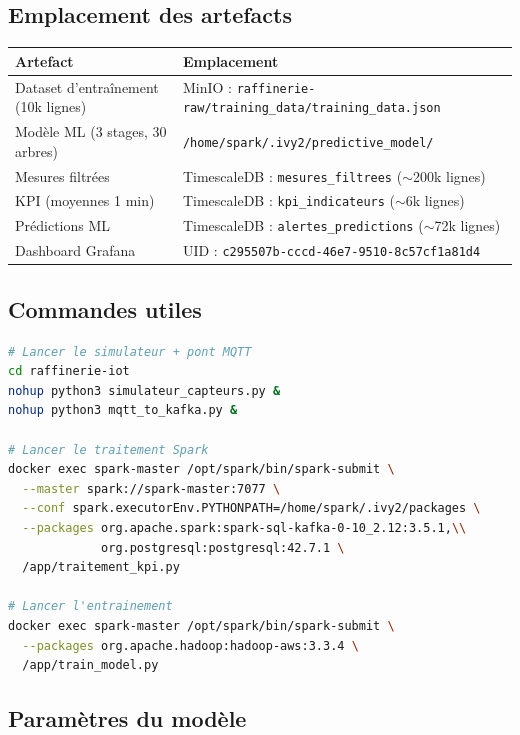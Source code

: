 \documentclass[11pt,a4paper]{article}
\begin{document}
\subsection*{Emplacement des artefacts}

\begin{center}
\small
\begin{tabularx}{\textwidth}{|l|X|}
\hline
\textbf{Artefact} & \textbf{Emplacement} \\
\hline
Dataset d'entraînement (10k lignes) & MinIO : \texttt{raffinerie-raw/training\_data/training\_data.json} \\
Modèle ML (3 stages, 30 arbres) & \texttt{/home/spark/.ivy2/predictive\_model/} \\
Mesures filtrées & TimescaleDB : \texttt{mesures\_filtrees} ($\sim$200k lignes) \\
KPI (moyennes 1 min) & TimescaleDB : \texttt{kpi\_indicateurs} ($\sim$6k lignes) \\
Prédictions ML & TimescaleDB : \texttt{alertes\_predictions} ($\sim$72k lignes) \\
Dashboard Grafana & UID : \texttt{c295507b-cccd-46e7-9510-8c57cf1a81d4} \\
\hline
\end{tabularx}
\end{center}

\subsection*{Commandes utiles}

\begin{lstlisting}[language=bash,caption={Redémarrage de la pipeline}]
# Lancer le simulateur + pont MQTT
cd raffinerie-iot
nohup python3 simulateur_capteurs.py &
nohup python3 mqtt_to_kafka.py &

# Lancer le traitement Spark
docker exec spark-master /opt/spark/bin/spark-submit \
  --master spark://spark-master:7077 \
  --conf spark.executorEnv.PYTHONPATH=/home/spark/.ivy2/packages \
  --packages org.apache.spark:spark-sql-kafka-0-10_2.12:3.5.1,\\
             org.postgresql:postgresql:42.7.1 \
  /app/traitement_kpi.py

# Lancer l'entrainement
docker exec spark-master /opt/spark/bin/spark-submit \
  --packages org.apache.hadoop:hadoop-aws:3.3.4 \
  /app/train_model.py
\end{lstlisting}

\subsection*{Paramètres du modèle}
\end{document}
